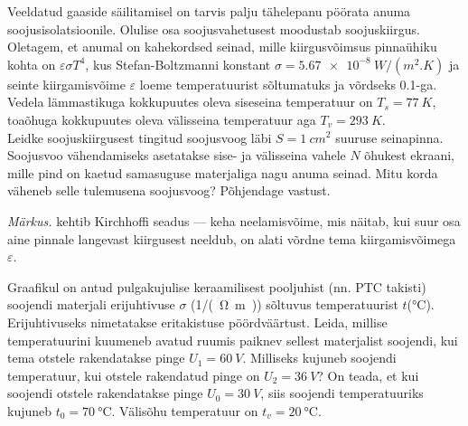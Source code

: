 \documentclass[10pt, twoside]{article}
\begin{document}
{%

Veeldatud gaaside säilitamisel on tarvis palju tähelepanu pöörata anuma soojusisolatsioonile. Olulise osa soojusvahetusest moodustab soojuskiirgus. Oletagem, et anumal on kahekordsed seinad, mille kiirgusvõimsus pinnaühiku kohta on $\varepsilon \sigma T^4$, kus Stefan-Boltzmanni konstant $\sigma = \SI{5,67e-8}{W/(m^2.K)}$ ja seinte kiirgamisvõime $\varepsilon$ loeme temperatuurist sõltumatuks ja võrdseks \num{0,1}-ga. Vedela lämmastikuga kokkupuutes oleva siseseina temperatuur on $T_s = \SI{77}{K}$, toaõhuga kokkupuutes oleva välisseina temperatuur aga $T_v = \SI{293}{K}$.\\
\osa Leidke soojuskiirgusest tingitud soojusvoog läbi $S = \SI{1}{cm^2}$ suuruse seinapinna.\\
\osa Soojusvoo vähendamiseks asetatakse sise- ja välisseina vahele $N$ õhukest ekraani, mille pind on kaetud samasuguse materjaliga nagu anuma seinad. Mitu korda väheneb selle tulemusena soojusvoog? Põhjendage vastust.

\emph{Märkus.} kehtib Kirchhoffi seadus --- keha neelamisvõime, mis näitab, kui suur osa aine pinnale langevast kiirgusest neeldub, on alati võrdne tema kiirgamisvõimega $\varepsilon$.\\
\probend
\bigskip


Graafikul on antud pulgakujulise keraamilisest pooljuhist (nn. PTC takisti) soojendi materjali erijuhtivuse $\sigma$ (\si{1/(\ohm. m)}) sõltuvus temperatuurist $t$(\si{\degreeCelsius}). Erijuhtivuseks nimetatakse eritakistuse pöördväärtust. Leida, millise temperatuurini kuumeneb avatud ruumis paiknev sellest materjalist soojendi, kui tema otstele rakendatakse pinge $U_1 = \SI{60}{V}$. Milliseks kujuneb soojendi temperatuur, kui otstele rakendatud pinge on $U_2 = \SI{36}{V}$? On teada, et kui soojendi otstele rakendatakse pinge $U_0 = \SI{30}{V}$, siis soojendi temperatuuriks kujuneb $t_0= \SI{70}{\degreeCelsius}$. Välisõhu temperatuur on $t_v = \SI{20}{\degreeCelsius}$.

}
\end{document}
